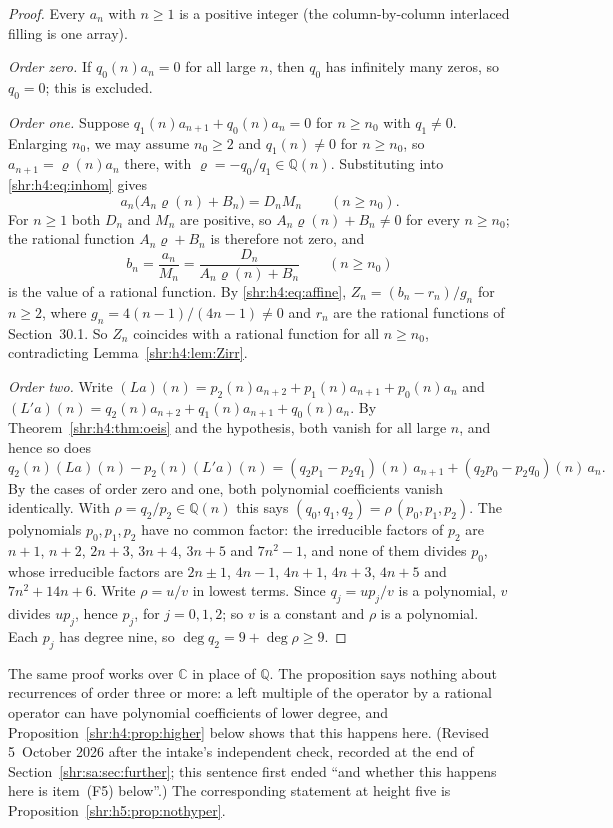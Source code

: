 \documentclass[11pt,letterpaper]{article}
\numberwithin{equation}{section}
\theoremstyle{definition}
\newcommand{\Q}{\mathbb Q}
\newcommand{\1}{\mathbf 1}
\begin{document}
\begin{proof}
Every $a_n$ with $n\ge1$ is a positive integer (the column-by-column
interlaced filling is one array).

\emph{Order zero.} If $q_0(n)a_n=0$ for all large $n$, then $q_0$ has
infinitely many zeros, so $q_0=0$; this is excluded.

\emph{Order one.} Suppose $q_1(n)a_{n+1}+q_0(n)a_n=0$ for $n\ge n_0$ with
$q_1\ne0$. Enlarging $n_0$, we may assume $n_0\ge2$ and $q_1(n)\ne0$ for
$n\ge n_0$, so $a_{n+1}=\varrho(n)a_n$ there, with
$\varrho=-q_0/q_1\in\Q(n)$. Substituting into \eqref{shr:h4:eq:inhom}
gives
\[
 a_n\bigl(A_n\varrho(n)+B_n\bigr)=D_nM_n\qquad(n\ge n_0).
\]
For $n\ge1$ both $D_n$ and $M_n$ are positive, so
$A_n\varrho(n)+B_n\ne0$ for every $n\ge n_0$; the rational function
$A_n\varrho+B_n$ is therefore not zero, and
\[
 b_n=\frac{a_n}{M_n}=\frac{D_n}{A_n\varrho(n)+B_n}\qquad(n\ge n_0)
\]
is the value of a rational function. By \eqref{shr:h4:eq:affine},
$Z_n=(b_n-r_n)/g_n$ for $n\ge2$, where $g_n=4(n-1)/(4n-1)\ne0$ and $r_n$
are the rational functions of Section~30.1. So $Z_n$ coincides with a
rational function for all $n\ge n_0$, contradicting
Lemma~\ref{shr:h4:lem:Zirr}.

\emph{Order two.} Write $(La)(n)=p_2(n)a_{n+2}+p_1(n)a_{n+1}+p_0(n)a_n$
and $(L'a)(n)=q_2(n)a_{n+2}+q_1(n)a_{n+1}+q_0(n)a_n$. By
Theorem~\ref{shr:h4:thm:oeis} and the hypothesis, both vanish for all large
$n$, and hence so does
\[
 q_2(n)(La)(n)-p_2(n)(L'a)(n)
 =(q_2p_1-p_2q_1)(n)\,a_{n+1}+(q_2p_0-p_2q_0)(n)\,a_n.
\]
By the cases of order zero and one, both polynomial coefficients vanish
identically. With $\rho=q_2/p_2\in\Q(n)$ this says
$(q_0,q_1,q_2)=\rho\,(p_0,p_1,p_2)$. The polynomials $p_0,p_1,p_2$ have no
common factor: the irreducible factors of $p_2$ are $n+1$, $n+2$, $2n+3$,
$3n+4$, $3n+5$ and $7n^2-1$, and none of them divides $p_0$, whose
irreducible factors are $2n\pm1$, $4n-1$, $4n+1$, $4n+3$, $4n+5$ and
$7n^2+14n+6$. Write $\rho=u/v$ in lowest terms. Since $q_j=up_j/v$ is a
polynomial, $v$ divides $up_j$, hence $p_j$, for $j=0,1,2$; so $v$ is a
constant and $\rho$ is a polynomial. Each $p_j$ has degree nine, so
$\deg q_2=9+\deg\rho\ge9$.
\end{proof}

The same proof works over $\mathbb C$ in place of $\Q$. The proposition
says nothing about recurrences of order three or more: a left multiple of
the operator by a rational operator can have polynomial coefficients of
lower degree, and Proposition~\ref{shr:h4:prop:higher} below shows that
this happens here. (Revised 5~October 2026 after the intake's independent
check, recorded at the end of Section~\ref{shr:sa:sec:further}; this
sentence first ended ``and whether this happens here is item~(F5)
below''.) The corresponding statement at height five is
Proposition~\ref{shr:h5:prop:nothyper}.
\end{document}
